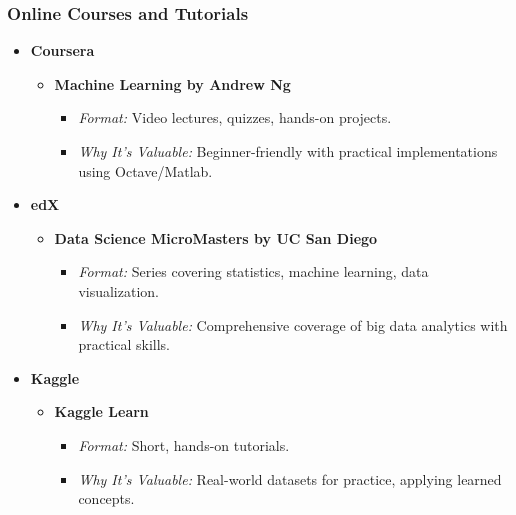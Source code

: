 \documentclass[aspectratio=169]{beamer}
\begin{document}
\begin{frame}[fragile]
    \frametitle{Online Courses and Tutorials}
    \begin{itemize}
        \item \textbf{Coursera}
            \begin{itemize}
                \item \textbf{Machine Learning by Andrew Ng}
                \begin{itemize}
                    \item \textit{Format:} Video lectures, quizzes, hands-on projects.
                    \item \textit{Why It’s Valuable:} Beginner-friendly with practical implementations using Octave/Matlab.
                \end{itemize}
            \end{itemize}
        \item \textbf{edX}
            \begin{itemize}
                \item \textbf{Data Science MicroMasters by UC San Diego}
                \begin{itemize}
                    \item \textit{Format:} Series covering statistics, machine learning, data visualization.
                    \item \textit{Why It’s Valuable:} Comprehensive coverage of big data analytics with practical skills.
                \end{itemize}
            \end{itemize}
        \item \textbf{Kaggle} 
            \begin{itemize}
                \item \textbf{Kaggle Learn}
                \begin{itemize}
                    \item \textit{Format:} Short, hands-on tutorials.
                    \item \textit{Why It’s Valuable:} Real-world datasets for practice, applying learned concepts.
                \end{itemize}
            \end{itemize}
    \end{itemize}
\end{frame}
\end{document}
